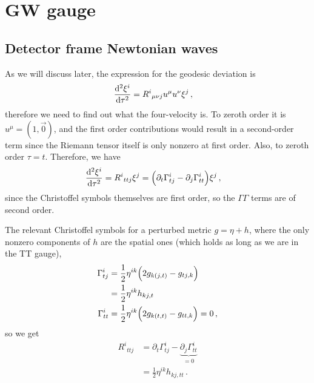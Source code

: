 \documentclass[main.tex]{subfiles}
\begin{document}
\section{GW gauge}

\subsection{Detector frame Newtonian waves}



As we will discuss later, the expression for the geodesic deviation is 
%
\begin{align}
\dv[2]{\xi^{i}}{\tau } &= R^{i}{}_{\mu \nu j} u^{\mu} u^{\nu } \xi^{j}
\,,
\end{align}
%
therefore we need to find out what the four-velocity is. To zeroth order it is \(u^{\mu } = (1, \vec{0})\), and the first order contributions would result in a second-order term since the Riemann tensor itself is only nonzero at first order. Also, to zeroth order \(\tau = t\).
Therefore, we have 
%
\begin{align}
\dv[2]{\xi^{i}}{\tau } &= R^{i}{}_{t t j} \xi^{j} = \qty( \partial_{t} \Gamma^{i}_{t j} - \partial_{j} \Gamma^{i}_{tt}) \xi^{j} 
\,,
\end{align}
%
since the Christoffel symbols themselves are first order, so the \(\Gamma \Gamma \) terms are of second order.

The relevant Christoffel symbols for a perturbed metric \(g = \eta + h\), where the only nonzero components of \(h\) are the spatial ones (which holds as long as we are in the TT gauge),
%
\begin{align}
\Gamma^{i}_{t j } &= \frac{1}{2} \eta^{i k } 
\qty( 2 g_{k (j , t )} - g_{t j, k })  \\
&= \frac{1}{2} \eta^{ik} h_{kj, t}   \\
\Gamma^{i}_{tt} &= \frac{1}{2} \eta^{i k}
\qty( 2 g_{k (t, t)} - g_{tt, k} ) = 0
\,,
\end{align}
%
so we get 
%
\begin{align}
R^{i}{}_{t t j} &= \partial_{t} \Gamma^{i}_{t j} - \underbrace{\partial_{j} \Gamma^{i}_{tt}}_{ = 0}  \\
&= \frac{1}{2} \eta^{i k} h_{k j, tt}
\,.
\end{align}
\end{document}
